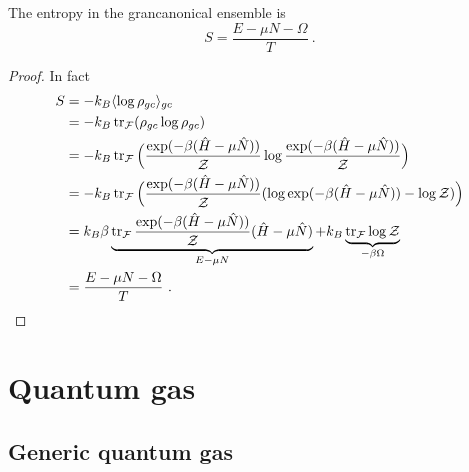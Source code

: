     The entropy in the grancanonical ensemble is 
    \begin{equation*}
        S = \frac{E - \mu N - \Omega}{T} ~.
    \end{equation*}
    \begin{proof}
        In fact 
        \begin{equation*}
        \begin{aligned}
            S & = - k_B \langle\log \rho_{gc}\rangle_{gc} \\ & = - k_B \operatorname{tr}_{\mathcal F} ( \rho_{gc} \log \rho_{gc}) \\ & = - k_B \operatorname{tr}_{\mathcal F} \Big ( \frac{\exp(- \beta (\hat H - \mu \hat N))}{\mathcal Z} \log \frac{\exp(- \beta (\hat H - \mu \hat N))}{\mathcal Z} \Big) \\ & = - k_B \operatorname{tr}_{\mathcal F} \Big ( \frac{\exp(- \beta (\hat H - \mu \hat N))}{\mathcal Z} (\log \exp(- \beta (\hat H - \mu \hat N)) - \log \mathcal Z) \Big) \\ & = k_B \beta \underbrace{\operatorname{tr}_{\mathcal F} \frac{\exp(- \beta (\hat H - \mu \hat N))}{\mathcal Z} (\hat H - \mu \hat N)}_{E - \mu N} + k_B \underbrace{\operatorname{tr}_{\mathcal F} \log \mathcal Z }_{- \beta \Omega} \\ & = \frac{E - \mu N - \Omega}{T} ~.
        \end{aligned}
        \end{equation*}
    \end{proof}

\chapter{Quantum gas}

\section{Generic quantum gas}

